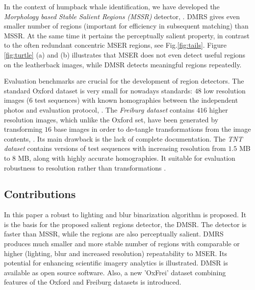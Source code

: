 \documentclass{article}
\begin{document}
In the context of humpback whale identification, we have developed the {\em Morphology based Stable Salient Regions (MSSR)} detector, \cite{RangMSSR06, RangHumpb06}. DMRS gives even smaller number of regions (important for efficiency in subsequent matching) than MSSR. At the same time  it pertains the perceptually salient property, in contrast to the often redundant concentric MSER regions, see Fig.\ref{fig:tails}. Figure \ref{fig:turtle} (a) and (b) illustrates that MSER does not even detect useful regions on the leatherback images, while DMSR detects meaningful regions repeatedly.

Evaluation benchmarks are crucial for the development of region detectors. The standard Oxford dataset is very small for nowadays standards: $48$ low resolution images ($6$ test sequences) with known homographies between the independent photos and evaluation protocol, \cite{Mikolajczyk:2005}.  The {\em Freiburg dataset} contains $416$ higher resolution images, which unlike the Oxford set, have been generated by transforming $16$ base images in order to de-tangle transformations from the image contents, \cite{FischerDB14}. Its main drawback is the lack of complete documentation. The {\em TNT dataset} contains versions of test sequences with increasing resolution from $1.5$ MB to $8$ MB, along with highly accurate homographies. It suitable for evaluation robustness to resolution rather than transformations \cite{CorRos2013}. 

\subsection{Contributions}
\label{ssec:contr}

In this paper a robust to lighting and blur binarization algorithm is proposed. It is the basis for the proposed salient regions detector, the DMSR. The detector is faster than MSSR, while the regions are also perceptually salient. DMRS produces much smaller and more stable number of regions with comparable or higher (lighting, blur and increased resolution) repeatability to MSER. Its potential for enhancing scientific imagery analytics is illustrated. DMSR is available as open source software. Also, a new 'OxFrei' dataset combining features of the Oxford and Freiburg datasets is introduced. %
\end{document}
